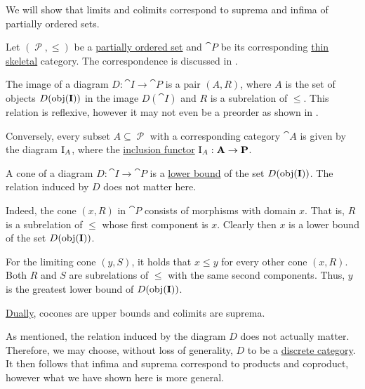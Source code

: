 \begin{example}\label{ex:limit_of_partially_ordered_set}
  We will show that limits and colimits correspond to suprema and infima of partially ordered sets.

  Let \( (\mscrP, \leq) \) be a \hyperref[def:partially_ordered_set]{partially ordered set} and \( \cat{P} \) be its corresponding \hyperref[def:thin_category]{thin} \hyperref[def:skeletal_category]{skeletal} category. The correspondence is discussed in .

  The image of a diagram \( D: \cat{I} \to \cat{P} \) is a pair \( (A, R) \), where \( A \) is the set of objects \( D(\operatorname{obj}(\operatorname{\mathbf{I}})) \) in the image \( D(\cat{I}) \) and \( R \) is a subrelation of \( \leq \). This relation is reflexive, however it may not even be a preorder as shown in .

  Conversely, every subset \( A \subseteq \mscrP \) with a corresponding category \( \cat{A} \) is given by the diagram \( \operatorname{I}_A \), where the \hyperref[def:subcategory]{inclusion functor} \( \operatorname{I}_A: \operatorname{\mathbf{A}} \to \operatorname{\mathbf{P}} \).

  A cone of a diagram \( D: \cat{I} \to \cat{P} \) is a \hyperref[def:partially_ordered_set_extremal_points/upper_and_lower_bounds]{lower bound} of the set \( D(\operatorname{obj}(\operatorname{\mathbf{I}})) \). The relation induced by \( D \) does not matter here.

  Indeed, the cone \( (x, R) \) in \( \cat{P} \) consists of morphisms with domain \( x \). That is, \( R \) is a subrelation of \( \leq \) whose first component is \( x \). Clearly then \( x \) is a lower bound of the set \( D(\operatorname{obj}(\operatorname{\mathbf{I}})) \).

  For the limiting cone \( (y, S) \), it holds that \( x \leq y \) for every other cone \( (x, R) \). Both \( R \) and \( S \) are subrelations of \( \leq \) with the same second components. Thus, \( y \) is the greatest lower bound of \( D(\operatorname{obj}(\operatorname{\mathbf{I}})) \).

  \hyperref[thm:categorical_principle_of_duality]{Dually}, cocones are upper bounds and colimits are suprema.

  As mentioned, the relation induced by the diagram \( D \) does not actually matter. Therefore, we may choose, without loss of generality, \( D \) to be a \hyperref[def:discrete_category]{discrete category}. It then follows that infima and suprema correspond to products and coproduct, however what we have shown here is more general.
\end{example}
